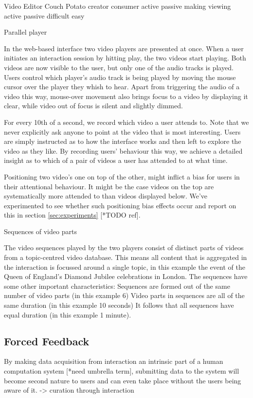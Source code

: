 Video Editor
Couch Potato
creator
consumer
active
passive
making
viewing
active
passive
difficult
easy

% 
% 
% 


Parallel player

In the web-based interface two video players are presented at once. When a user initiates an interaction session by hitting play, the two videos start playing. Both videos are now visible to the user, but only one of the audio tracks is played. Users control which player's audio track is being played by moving the mouse cursor over the player they whish to hear. Apart from triggering the audio of a video this way, mouse-over movement also brings focus to a video by displaying it clear, while video out of focus is silent and slightly dimmed.

For every 10th of a second, we record which video a user attends to. Note that we never explicitly ask anyone to point at the video that is most interesting. Users are simply instructed as to how the interface works and then left to explore the video as they like. By recording users' behaviour this way, we achieve a detailed insight as to which of a pair of videos a user has attended to at what time.

Positioning two video's one on top of the other, might inflict a bias for users in their attentional behaviour. It might be the case videos on the top are systematically more attended to than videos displayed below. We've experimented to see whether such positioning bias effects occur and report on this in section \ref{sec:experiments} [*TODO ref].

Sequences of video parts

The video sequences played by the two players consist of distinct parts of videos from a topic-centred video database. This means all content that is aggregated in the interaction is focussed around a single topic, in this example the event of the Queen of England's Diamond Jubilee celebrations in London. The sequences have some other important characteristics:
Sequences are formed out of the same number of video parts (in this example 6)
Video parts in sequences are all of the same duration (in this example 10 seconds)
It follows that all sequences have equal duration (in this example 1 minute).




\subsection{Forced Feedback}
By making data acquisition from interaction an intrinsic part of a human computation system [*need umbrella term], submitting data to the system will become second nature to users and can even take place without the users being aware of it.
	-> curation through interaction


